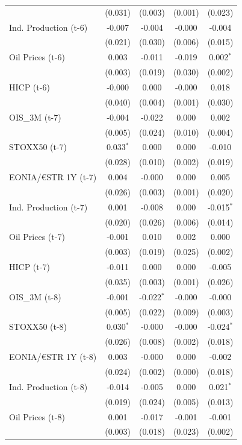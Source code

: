 \begin{longtable}[t]{lcccc}
 & (0.031) & (0.003) & (0.001) & \vphantom{1} (0.023)\\
Ind. Production (t-6) & -0.007 & -0.004 & -0.000 & -0.004\\
 & (0.021) & (0.030) & (0.006) & (0.015)\\
Oil Prices (t-6) & 0.003 & -0.011 & -0.019 & 0.002$^{*}$\\
 & (0.003) & (0.019) & (0.030) & (0.002)\\
HICP (t-6) & -0.000 & 0.000 & -0.000 & 0.018\\
 & (0.040) & (0.004) & (0.001) & (0.030)\\
OIS\_3M (t-7) & -0.004 & -0.022 & 0.000 & 0.002\\
 & (0.005) & (0.024) & (0.010) & (0.004)\\
STOXX50 (t-7) & 0.033$^{*}$ & 0.000 & 0.000 & -0.010\\
 & (0.028) & (0.010) & (0.002) & (0.019)\\
EONIA/€STR 1Y (t-7) & 0.004 & -0.000 & 0.000 & 0.005\\
 & (0.026) & (0.003) & (0.001) & (0.020)\\
Ind. Production (t-7) & 0.001 & -0.008 & 0.000 & -0.015$^{*}$\\
 & (0.020) & (0.026) & (0.006) & (0.014)\\
Oil Prices (t-7) & -0.001 & 0.010 & 0.002 & 0.000\\
 & (0.003) & (0.019) & (0.025) & (0.002)\\
HICP (t-7) & -0.011 & 0.000 & 0.000 & -0.005\\
 & (0.035) & (0.003) & (0.001) & (0.026)\\
OIS\_3M (t-8) & -0.001 & -0.022$^{*}$ & -0.000 & -0.000\\
 & (0.005) & (0.022) & (0.009) & (0.003)\\
STOXX50 (t-8) & 0.030$^{*}$ & -0.000 & -0.000 & -0.024$^{*}$\\
 & (0.026) & (0.008) & (0.002) & (0.018)\\
EONIA/€STR 1Y (t-8) & 0.003 & -0.000 & 0.000 & -0.002\\
 & (0.024) & (0.002) & (0.000) & (0.018)\\
Ind. Production (t-8) & -0.014 & -0.005 & 0.000 & 0.021$^{*}$\\
 & (0.019) & (0.024) & (0.005) & (0.013)\\
Oil Prices (t-8) & 0.001 & -0.017 & -0.001 & -0.001\\
 & (0.003) & (0.018) & (0.023) & (0.002)\\

\end{longtable}
